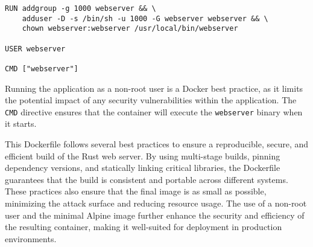 \begin{lstlisting}[caption={Running the Application as a Non-Root User}]
RUN addgroup -g 1000 webserver && \
    adduser -D -s /bin/sh -u 1000 -G webserver webserver && \
    chown webserver:webserver /usr/local/bin/webserver

USER webserver

CMD ["webserver"]
\end{lstlisting}

Running the application as a non-root user is a Docker best practice, as it limits
the potential impact of any security vulnerabilities within the application. The
\texttt{CMD} directive ensures that the container will execute the \texttt{webserver}
binary when it starts.

This Dockerfile follows several best practices to ensure a reproducible, secure, and
efficient build of the Rust web server. By using multi-stage builds, pinning dependency
versions, and statically linking critical libraries, the Dockerfile guarantees that
the build is consistent and portable across different systems. These practices also
ensure that the final image is as small as possible, minimizing the attack surface and
reducing resource usage. The use of a non-root user and the minimal Alpine image
further enhance the security and efficiency of the resulting container, making it
well-suited for deployment in production environments.

